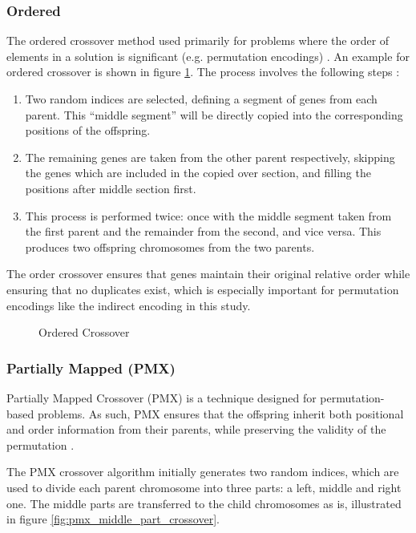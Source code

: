 \documentclass[english,examples]{isasthesis}
\begin{document}
\subsubsection{Ordered}
The ordered crossover method used primarily for problems where the order of
elements in a solution is significant (e.g. permutation encodings)
\cite{Katoch2021}.
An example for ordered crossover is shown in figure \ref{fig:ordered_crossover}.
The process involves the following steps \cite{Katoch2021}:
\begin{enumerate}
    \item   Two random indices are selected, defining a segment of genes from
            each parent. This \enquote{middle segment} will be directly copied
            into the corresponding positions of the offspring.

    \item   The remaining genes are taken from the other parent respectively,
            skipping the genes which are included in the copied over section,
            and filling the positions after middle section first.

    \item   This process is performed twice: once with the middle segment taken
            from the first parent and the remainder from the second, and
            vice versa. This produces two offspring chromosomes from the two
            parents.
\end{enumerate}

The order crossover ensures that genes maintain their original relative order
while ensuring that no duplicates exist, which is especially important for
permutation encodings like the indirect encoding in this study.

\begin{figure}[]
    \centering
    
    \caption{Ordered Crossover}
    \label{fig:ordered_crossover}
\end{figure}

\subsubsection{Partially Mapped (PMX)}
Partially Mapped Crossover (PMX) is a technique designed for
permutation-based problems.
As such, PMX ensures that the offspring inherit both positional and order
information from their parents, while preserving the validity of the
permutation \cite{Katoch2021}.

The PMX crossover algorithm initially generates two random indices, which are
used to divide each parent chromosome into three parts: a left, middle and
right one. The middle parts are transferred to the child chromosomes as is,
illustrated in figure \ref{fig:pmx_middle_part_crossover}.
\end{document}
